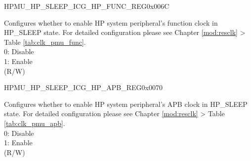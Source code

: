 \begin{register}{H}{PMU\_HP\_SLEEP\_ICG\_HP\_FUNC\_REG}{0x006C}\label{regdesc:PMUHPSLEEPICGHPFUNCREG}
%
\regnewline%
\begin{regdesc}\begin{reglist}
\label{fielddesc:PMUHPSLEEPDIGICGFUNCEN}\item [PMU\_HP\_SLEEP\_DIG\_ICG\_FUNC\_EN] Configures whether to enable HP system peripheral's function clock in HP\_SLEEP state. For detailed configuration please see Chapter \ref{mod:resclk} \textit{} > Table \ref{tab:clk_pmu_func}. \\
0: Disable\\
1: Enable\\
(R/W)
\end{reglist}\end{regdesc}
\end{register}


\begin{register}{H}{PMU\_HP\_SLEEP\_ICG\_HP\_APB\_REG}{0x0070}\label{regdesc:PMUHPSLEEPICGHPAPBREG}
%
\regnewline%
\begin{regdesc}\begin{reglist}
\label{fielddesc:PMUHPSLEEPDIGICGAPBEN}\item [PMU\_HP\_SLEEP\_DIG\_ICG\_APB\_EN] Configures whether to enable HP system peripheral's APB clock in HP\_SLEEP state. For detailed configuration please see Chapter \ref{mod:resclk} \textit{} > Table \ref{tab:clk_pmu_apb}. \\
0: Disable\\
1: Enable\\
(R/W)
\end{reglist}\end{regdesc}
\end{register}




